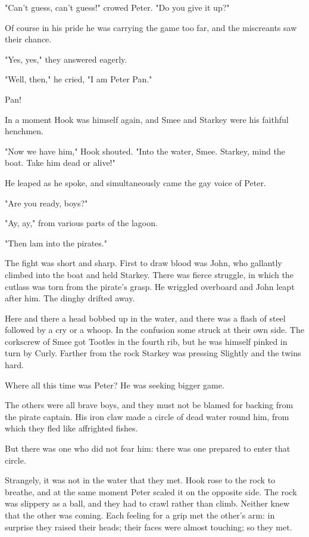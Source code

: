 "Can't guess, can't guess!" crowed Peter. "Do you give it up?"


Of course in his pride he was carrying the game too far, and the
miscreants saw their chance.


"Yes, yes," they answered eagerly.


"Well, then," he cried, "I am Peter Pan."


Pan!


In a moment Hook was himself again, and Smee and Starkey were his faithful
henchmen.


"Now we have him," Hook shouted. "Into the water, Smee. Starkey, mind the
boat. Take him dead or alive!"


He leaped as he spoke, and simultaneously came the gay voice of Peter.


"Are you ready, boys?"


"Ay, ay," from various parts of the lagoon.


"Then lam into the pirates."


The fight was short and sharp. First to draw blood was John, who gallantly
climbed into the boat and held Starkey. There was fierce struggle, in
which the cutlass was torn from the pirate's grasp. He wriggled overboard
and John leapt after him. The dinghy drifted away.


Here and there a head bobbed up in the water, and there was a flash of
steel followed by a cry or a whoop. In the confusion some struck at their
own side. The corkscrew of Smee got Tootles in the fourth rib, but he was
himself pinked in turn by Curly. Farther from the rock Starkey
was pressing Slightly and the twins hard.


Where all this time was Peter? He was seeking bigger game.


The others were all brave boys, and they must not be blamed for backing
from the pirate captain. His iron claw made a circle of dead water round
him, from which they fled like affrighted fishes.


But there was one who did not fear him: there was one prepared to enter
that circle.


Strangely, it was not in the water that they met. Hook rose to the rock to
breathe, and at the same moment Peter scaled it on the opposite side. The
rock was slippery as a ball, and they had to crawl rather than climb.
Neither knew that the other was coming. Each feeling for a grip met the
other's arm: in surprise they raised their heads; their faces were almost
touching; so they met.


